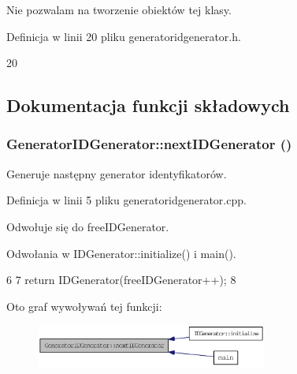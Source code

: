 Nie pozwalam na tworzenie obiektów tej klasy. 



Definicja w linii 20 pliku generatoridgenerator.h.




\begin{DoxyCode}
20 {}
\end{DoxyCode}




\subsection{Dokumentacja funkcji składowych}
\hypertarget{classGeneratorIDGenerator_ac6dd43ecbbe2ed1647855e72156dbcb2}{
\subsubsection[{nextIDGenerator}]{ GeneratorIDGenerator::nextIDGenerator ()}}
\label{classGeneratorIDGenerator_ac6dd43ecbbe2ed1647855e72156dbcb2}


Generuje następny generator identyfikatorów. 



Definicja w linii 5 pliku generatoridgenerator.cpp.



Odwołuje się do freeIDGenerator.



Odwołania w IDGenerator::initialize() i main().




\begin{DoxyCode}
6 {
7     return IDGenerator(freeIDGenerator++);
8 }
\end{DoxyCode}




Oto graf wywoływań tej funkcji:\nopagebreak
\begin{figure}[H]
\begin{center}
\leavevmode
\includegraphics[width=216pt]{classGeneratorIDGenerator_ac6dd43ecbbe2ed1647855e72156dbcb2_icgraph}
\end{center}
\end{figure}


